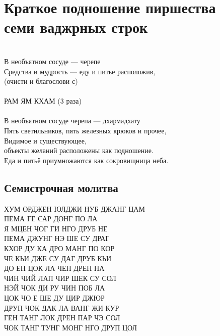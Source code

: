 \documentclass[4pt,oneside]{article}
\begin{document}
   \thispagestyle{empty}

\setmainfont{Geometria}

\section{Краткое подношение пиршества \\семи ваджрных строк}
\\
В необъятном сосуде — черепе\\
Средства и мудрость — еду и питье расположив,\\
(очисти и благослови с)\\
\\
РАМ ЯМ КХАМ \scriptsize(3 раза)\normalsize\\
\\
В необъятном сосуде черепа — дхармадхату\\
Пять светильников, пять железных крюков и прочее,\\
Видимое и существующее, \\ \indent объекты желаний расположены как подношение.\\
Еда и питьё приумножаются как сокровищница неба.\\

\subsection*{Семистрочная молитва}

\begingroup
\parbox[t][][l]{0.40\textwidth}{
}
\hspace{0.2cm}
\parbox[t][][r]{0.60\textwidth}{
\small
\vspace{0.1cm}
ХУМ ОРДЖЕН ЮЛДЖИ НУБ ДЖАНГ ЦАМ\\
ПЕМА ГЕ САР ДОНГ ПО ЛА\\
Я МЦЕН ЧОГ ГИ НГО ДРУБ НЕ\\
ПЕМА ДЖУНГ НЭ ШЕ СУ ДРАГ\\
КХОР ДУ КА ДРО МАНГ ПО КОР\\
ЧЕ КЬИ ДЖЕ СУ ДАГ ДРУБ КЬИ\\
ДО ЕН ЦОК ЛА ЧЕН ДРЕН НА\\
ЧИН ЧИЙ ЛАП ЧИР ШЕК СУ СОЛ\\
НЭЙ ЧОК ДИ РУ ЧИН ПОБ ЛА\\
ЦОК ЧО Е ШЕ ДУ ЦИР ДЖЮР\\
ДРУП ЧОК ДАК ЛА ВАНГ ЖИ КУР\\
ГЕН ТАНГ ЛОК ДРЕН ПАР ЧЭ СОЛ\\
ЧОК ТАНГ ТУНГ МОНГ НГО ДРУП ЦОЛ\\
}
\endgroup
\end{document}
